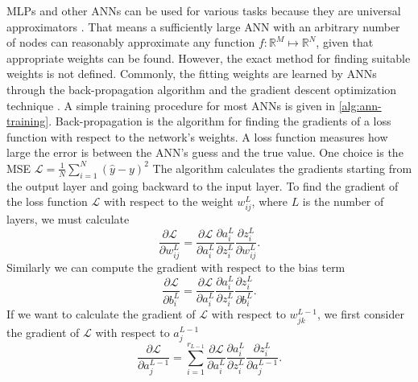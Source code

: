 \glspl{MLP} and other \glspl{ANN} can be used for various tasks because they are universal approximators \cite{cybenkotApproximationSuperpositionsSigmoidal, hornikApproximationCapabilitiesMultilayer1991, hornikMultilayerFeedforwardNetworks1989}.
That means a sufficiently large \gls{ANN} with an arbitrary number of nodes can reasonably approximate any function $f: \mathbb{R}^M \mapsto \mathbb{R}^N$, given that appropriate weights can be found.
However, the exact method for finding suitable weights is not defined.
Commonly, the fitting weights are learned by \glspl{ANN} through the back-propagation algorithm \cite{rumelhartLearningRepresentationsBackpropagating1986} and the gradient descent optimization technique \cite{ruderOverviewGradientDescent2017}.
A simple training procedure for most \glspl{ANN} is given in \autoref{alg:ann-training}.
Back-propagation is the algorithm for finding the gradients of a loss function with respect to the network's weights.
A loss function measures how large the error is between the \gls{ANN}'s guess and the true value.
One choice is the \gls{MSE} $\mathcal{L} = \frac{1}{N} \sum_{i=1}^N (\hat{y} - y)^2$
The algorithm calculates the gradients starting from the output layer and going backward to the input layer.
To find the gradient of the loss function $\mathcal{L}$ with respect to the weight $w_{ij}^L$, where $L$ is the number of layers, we must calculate
\begin{equation}
    \frac{\partial \mathcal{L}}{\partial w_{ij}^L} = \frac{\partial\mathcal{L}}{\partial a_i^L} \frac{\partial a_i^L}{\partial z_i^L} \frac{\partial z_i^L}{\partial w_{ij}^L}.
    \label{eq:backpropagation-ouput-layer-weights}
\end{equation}
Similarly we can compute the gradient with respect to the bias term
\begin{equation}
    \frac{\partial \mathcal{L}}{\partial b_i^L} = \frac{\partial\mathcal{L}}{\partial a_i^L} \frac{\partial a_i^L}{\partial z_i^L} \frac{\partial z_i^L}{\partial b_i^L}.
    \label{eq:backpropagation-ouput-layer-bias}
\end{equation}
If we want to calculate the gradient of $\mathcal{L}$ with respect to $w_{jk}^{L-1}$, we first consider the gradient of $\mathcal{L}$ with respect to $a_j^{L-1}$
\begin{equation}
    \frac{\partial \mathcal{L}}{\partial a_j^{L-1}} = \sum_{i=1}^{r_{L-1}} \frac{\partial\mathcal{L}}{\partial a_i^L} \frac{\partial a_i^L}{\partial z_i^L} \frac{\partial z_i^L}{\partial a_j^{L-1}}.
    \label{eq:backpropagation-hidden-layer-activation}
\end{equation}
